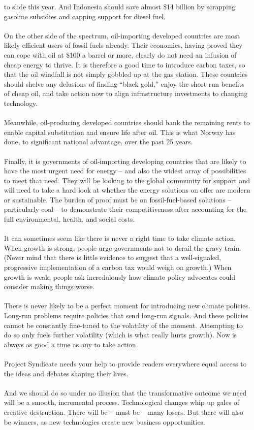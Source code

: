 \documentclass{article}
\begin{document}
to slide this year. And Indonesia should save almost \$14 billion by scrapping gasoline subsidies and capping support for diesel fuel.\\\\On the other side of the spectrum, oil{-}importing developed countries are most likely efficient users of fossil fuels already. Their economies, having proved they can cope with oil at \$100 a barrel or more, clearly do not need an infusion of cheap energy to thrive. It is therefore a good time to introduce carbon taxes, so that the oil windfall is not simply gobbled up at the gas station. These countries should shelve any delusions of finding “black gold,” enjoy the short{-}run benefits of cheap oil, and take action now to align infrastructure investments to changing technology.\\\\Meanwhile, oil{-}producing developed countries should bank the remaining rents to enable capital substitution and ensure life after oil. This is what Norway has done, to significant national advantage, over the past 25 years.\\\\Finally, it is governments of oil{-}importing developing countries that are likely to have the most urgent need for energy – and also the widest array of possibilities to meet that need. They will be looking to the global community for support and will need to take a hard look at whether the energy solutions on offer are modern or sustainable. The burden of proof must be on fossil{-}fuel{-}based solutions – particularly coal – to demonstrate their competitiveness after accounting for the full environmental, health, and social costs.\\\\It can sometimes seem like there is never a right time to take climate action. When growth is strong, people urge governments not to derail the gravy train. (Never mind that there is little evidence to suggest that a well{-}signaled, progressive implementation of a carbon tax would weigh on growth.) When growth is weak, people ask incredulously how climate policy advocates could consider making things worse.\\\\There is never likely to be a perfect moment for introducing new climate policies. Long{-}run problems require policies that send long{-}run signals. And these policies cannot be constantly fine{-}tuned to the volatility of the moment. Attempting to do so only fuels further volatility (which is what really hurts growth). Now is always as good a time as any to take action.\\\\Project Syndicate needs your help to provide readers everywhere equal access to the ideas and debates shaping their lives.\\\\And we should do so under no illusion that the transformative outcome we need will be a smooth, incremental process. Technological changes whip up gales of creative destruction. There will be – must be – many losers. But there will also be winners, as new technologies create new business opportunities. 
\end{document}
